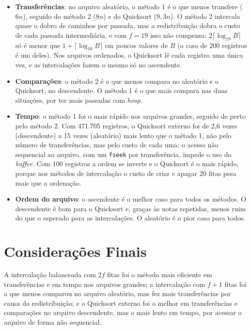 \documentclass{article}
\begin{document}
\begin{itemize}
    \item \textbf{Transferências}: no arquivo aleatório, o método 1 é o que menos transfere ($6n$), seguido do método 2 ($8n$) e do Quicksort ($9{,}3n$). O método 2 intercala quase o dobro de caminhos por passada, mas a redistribuição dobra o custo de cada passada intermediária, e com $f = 19$ isso não compensa: $2\lceil \log_{19} B \rceil$ só é menor que $1 + \lceil \log_{10} B \rceil$ em poucos valores de $B$ (o caso de 200 registros é um deles). Nos arquivos ordenados, o Quicksort lê cada registro uma única vez, e as intercalações fazem o mesmo só no ascendente.
    \item \textbf{Comparações}: o método 2 é o que menos compara no aleatório e o Quicksort, no descendente. O método 1 é o que mais compara nas duas situações, por ter mais passadas com \emph{heap}.
    \item \textbf{Tempo}: o método 1 foi o mais rápido nos arquivos grandes, seguido de perto pelo método 2. Com 471.705 registros, o Quicksort externo foi de 2,6 vezes (descendente) a 15 vezes (aleatório) mais lento que o método 1, não pelo número de transferências, mas pelo custo de cada uma: o acesso não sequencial ao arquivo, com um \texttt{fseek} por transferência, impede o uso do \emph{buffer}. Com 100 registros a ordem se inverte e o Quicksort é o mais rápido, porque nos métodos de intercalação o custo de criar e apagar 20 fitas pesa mais que a ordenação.
    \item \textbf{Ordem do arquivo}: o ascendente é o melhor caso para todos os métodos. O descendente é bom para o Quicksort e, graças às notas repetidas, menos ruim do que o esperado para as intercalações. O aleatório é o pior caso para todos.
\end{itemize}

\clearpage
\section{Considerações Finais}

A intercalação balanceada com $2f$ fitas foi o método mais eficiente em transferências e em tempo nos arquivos grandes; a intercalação com $f+1$ fitas foi a que menos comparou no arquivo aleatório, mas fez mais transferências por causa da redistribuição; e o Quicksort externo foi o melhor em transferências e comparações no arquivo descendente, mas o mais lento em tempo, por acessar o arquivo de forma não sequencial.
\end{document}
